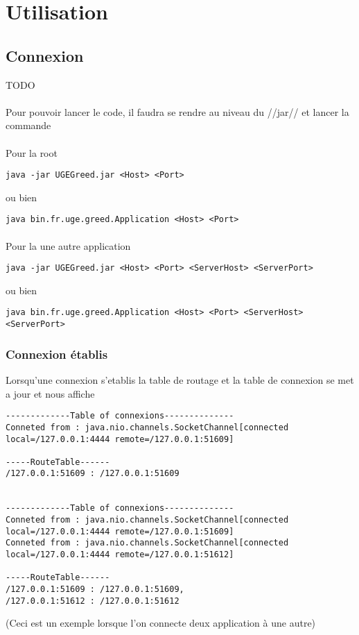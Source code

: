 \documentclass[a4paper,titlepage]{report}
\begin{document}
\section{Utilisation}
\subsection{Connexion}
TODO
\paragraph{}
Pour pouvoir lancer le code, il faudra se rendre au niveau du //jar// et lancer la commande 
\paragraph{}

Pour la root
\begin{lstlisting}
java -jar UGEGreed.jar <Host> <Port>
\end{lstlisting}
ou bien
\begin{lstlisting}
java bin.fr.uge.greed.Application <Host> <Port>
\end{lstlisting}
\paragraph{}
Pour la une autre application
\begin{lstlisting}
java -jar UGEGreed.jar <Host> <Port> <ServerHost> <ServerPort>
\end{lstlisting}
ou bien
\begin{lstlisting}
java bin.fr.uge.greed.Application <Host> <Port> <ServerHost> <ServerPort>
\end{lstlisting}
\subsubsection{Connexion établis}
Lorsqu'une connexion s'etablis la table de routage et la table de connexion se met a jour et nous affiche
\begin{lstlisting}
-------------Table of connexions--------------
Conneted from : java.nio.channels.SocketChannel[connected local=/127.0.0.1:4444 remote=/127.0.0.1:51609]

-----RouteTable------
/127.0.0.1:51609 : /127.0.0.1:51609


-------------Table of connexions--------------
Conneted from : java.nio.channels.SocketChannel[connected local=/127.0.0.1:4444 remote=/127.0.0.1:51609]
Conneted from : java.nio.channels.SocketChannel[connected local=/127.0.0.1:4444 remote=/127.0.0.1:51612]

-----RouteTable------
/127.0.0.1:51609 : /127.0.0.1:51609,
/127.0.0.1:51612 : /127.0.0.1:51612
\end{lstlisting}
(Ceci est un exemple lorsque l'on connecte deux application à une autre)
\end{document}
